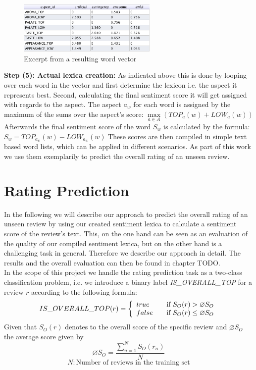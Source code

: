\documentclass[11pt,titlepage,oneside,openany]{book}
\begin{document}
\begin{figure}[h]
  \label{fig:wordvector}
  \centering
    \includegraphics[width=0.6\textwidth]{wordvector}
    \caption{Excerpt from a resulting word vector}
\end{figure}


\textbf{Step (5): Actual lexica creation:} As indicated above this is done by looping over each word in the vector and first determine the lexicon i.e. the aspect it represents best. Second, calculating the final sentiment score it will get assigned with regards to the aspect. The aspect $a_w$ for each word is assigned by the maximum of the sums over the aspect's score: 
$\underset{a \in A}{\max} (\mbox{$TOP_a$}(w) + \mbox{$LOW_a$}(w))$ \\
Afterwards the final sentiment score of the word $S_w$ is calculated by the formula: $S_w = TOP_{a_w}(w) - LOW_{a_w}(w)$ These scores are then compiled in simple text based word lists, which can be applied in different scenarios. As part of this work we use them exemplarily to predict the overall rating of an unseen review.



\section{Rating Prediction}

In the following we will describe our approach to predict the overall rating of an unseen review by using our created sentiment lexica to calculate a sentiment score of the review's text. This, on the one hand can be seen as an evaluation of the quality of our compiled sentiment lexica, but on the other hand is a challenging task in general. Therefore we describe our approach in detail. The results and the overall evaluation can then be found in chapter TODO.\\
In the scope of this project we handle the rating prediction task as a two-class classification problem, i.e. we introduce a binary label \emph{IS\_OVERALL\_TOP} for a review $r$ according to the following formula:
\[ IS\_OVERALL\_TOP(r) = \left\{ 
  \begin{array}{l l}
    true & \quad \text{if $S_{O}(r) > \varnothing S_{O}$}\\
    false & \quad \text{if $S_{O}(r) \leq \varnothing S_{O}$}
  \end{array} \right.\]
Given that $S_{O}(r)$ denotes to the overall score of the specific review and $\varnothing S_{O}$ the average score given by $$\varnothing S_{O} = \frac{\sum_{n=1}^{N}S_{O}(r_n)}{N}  $$
$$ N:\text{Number of reviews in the training set} $$
\end{document}
